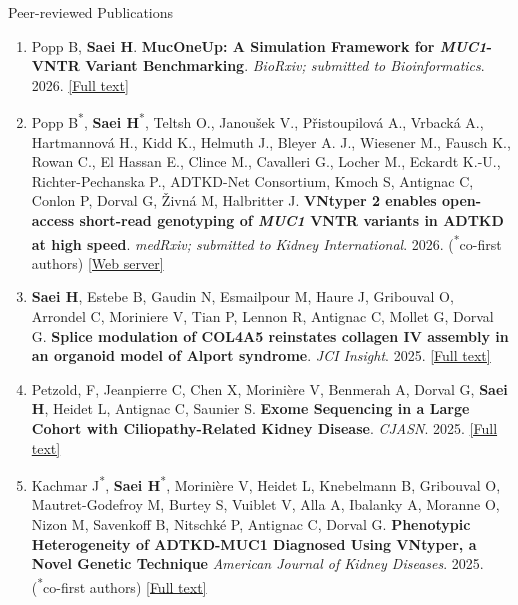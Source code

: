 \documentclass[
	11pt, %
]{resume} %
\begin{document}

\begin{rSection}{Peer-reviewed Publications}

\begin{enumerate}
  \item  Popp B, \textbf{Saei H}.
  \textbf{MucOneUp: A Simulation Framework for \textit{MUC1}-VNTR Variant Benchmarking}. 
  \textit{BioRxiv; submitted to Bioinformatics}. 2026. \href{https://www.biorxiv.org/content/10.64898/2026.05.08.723876v1}{[Full text]}

  \item Popp B\textsuperscript{*}, \textbf{Saei H}\textsuperscript{*}, Teltsh O., Janoušek V., Přistoupilová A., Vrbacká A., Hartmannová H., Kidd K., Helmuth J., Bleyer A. J., Wiesener M., Fausch K., Rowan C., El Hassan E., Clince M., Cavalleri G., Locher M., Eckardt K.-U., Richter-Pechanska P., ADTKD-Net Consortium, Kmoch S, Antignac C, Conlon P, Dorval G, Živná M, Halbritter J.
  \textbf{VNtyper 2 enables open-access short-read genotyping of \textit{MUC1} VNTR variants in ADTKD at high speed}.  
  \textit{medRxiv; submitted to Kidney International}. 2026. (\textsuperscript{*}co-first authors) \href{https://vntyper.org/}{[Web server]}
  
  \item \textbf{Saei H},  Estebe B, Gaudin N, Esmailpour M, Haure J,  Gribouval O,  Arrondel C,  Moriniere V,  Tian P,  Lennon R,  Antignac C,  Mollet G, Dorval G. 
  \textbf{Splice modulation of COL4A5 reinstates collagen IV assembly in an organoid model of Alport syndrome}. 
  \textit{JCI Insight}. 2025. \href{https://insight.jci.org/articles/view/194759}{[Full text]}
  
    \item Petzold, F, Jeanpierre C, Chen X, Morinière V, Benmerah A, Dorval G, \textbf{Saei H}, Heidet L, Antignac C, Saunier S.
  \textbf{Exome Sequencing in a Large Cohort with Ciliopathy-Related Kidney Disease}.
  \textit{CJASN}. 2025. \href{https://journals.lww.com/cjasn/abstract/9900/exome_sequencing_in_a_large_cohort_with.802.aspx}{[Full text]}
  
    \item Kachmar J\textsuperscript{*}, \textbf{Saei H}\textsuperscript{*}, Morinière V, Heidet L, Knebelmann B, Gribouval O, Mautret-Godefroy M, Burtey S, Vuiblet V,  Alla A, Ibalanky A, Moranne O, Nizon M, Savenkoff B, Nitschké P, Antignac C, Dorval G.
   \textbf{Phenotypic Heterogeneity of ADTKD-MUC1 Diagnosed Using VNtyper, a Novel Genetic Technique}
  \textit{American Journal of Kidney Diseases}. 2025. (\textsuperscript{*}co-first authors) \href{https://www.ajkd.org/article/S0272-6386(25)00038-1/abstract}{[Full text]}
  

\end{enumerate}
\end{rSection}
\end{document}
